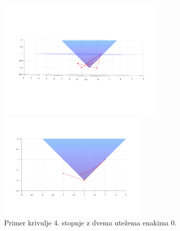 \documentclass[a4paper,11pt]{article}
\theoremstyle{definition}
\theoremstyle{plain}
\begin{document}
\begin{figure}[ht!]
    \begin{minipage}{0.5\textwidth}
        \centering
        \includegraphics[width=80mm]{kriv4_1b.png}
    \end{minipage}\hfill
    \begin{minipage}{0.5\textwidth}
        \centering
        \includegraphics[width=70mm]{kriv4_1c.png}
    \end{minipage}\hfill
    \caption{Primer krivulje 4. stopnje z dvema utežema enakima 0.}
    \label{slika:kriv4}
\end{figure}
\end{document}
